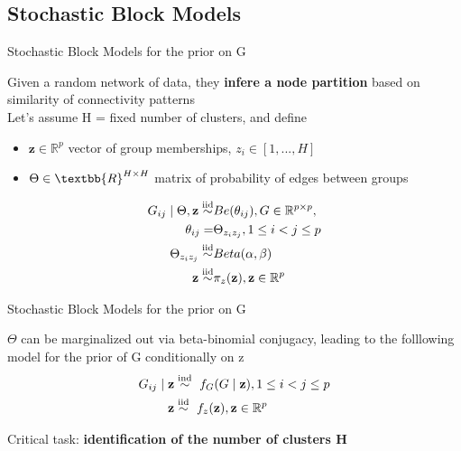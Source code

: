 \subsection{Stochastic Block Models}
\begin{frame}{Stochastic Block Models for the prior on G}

Given a random network of data, they \textbf{infere a node partition} based on similarity of connectivity patterns\\

Let's assume H = fixed number of clusters, and define 
\begin{itemize}
    \item $\mathbf{z} \in \mathbb{R}^p$ vector of group memberships, $z_{i} \in [1,...,H]$
    \item $\Theta \in \textbb{R}^{H\times H}$ matrix of probability of edges between groups
\end{itemize} 
\centering
\begin{align*}
    G_{ij} \mid \Theta,\mathbf{z} \overset{\mathrm{iid}}{\sim} & Be(\theta_{ij}),  G \in \mathbb{R}^{p \times p}, \\
    \theta_{ij} = &\Theta_{z_{i}z_{j}}, 1 \le i < j \le p \\ 
    \Theta_{z_{i}z_{j}} \overset{\mathrm{iid}}{\sim}& Beta(\alpha, \beta)\\
    \mathbf{z} \overset{\mathrm{iid}}{\sim} & \pi_{z}(\mathbf{z}), \mathbf{z} \in \mathbb{R}^p
\end{align*}


\end{frame}




\begin{frame}{Stochastic Block Models for the prior on G}

$\Theta$ can be marginalized out via beta-binomial conjugacy, leading to the folllowing model for the prior of G conditionally on z 
\centering
\begin{align*}
    G_{ij} \mid \mathbf{z} &\ind\  f_{G}(G \mid \mathbf{z}) , 1 \le i < j \le p \\ %
    \mathbf{z} &\iid\ f_{z}(\mathbf{z}), \mathbf{z} \in \mathbb{R}^p
  \end{align*}

 \large Critical task: \textbf{identification of the number of clusters H}

\end{frame}



